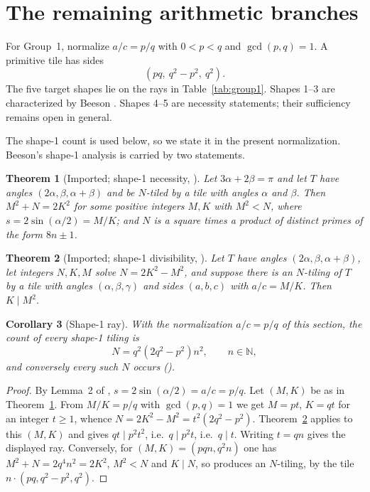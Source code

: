 \documentclass[11pt]{amsart}
\newtheorem{theorem}{Theorem}
\newtheorem{corollary}[theorem]{Corollary}
\theoremstyle{definition}
\theoremstyle{remark}
\newcommand{\N}{\mathbb N}
\begin{document}
\section{The remaining arithmetic branches}\label{sec:otherbranches}

For Group~1, normalize $a/c=p/q$ with $0<p<q$ and $\gcd(p,q)=1$.  A primitive
tile has sides
\[
                  (pq,\ q^2-p^2,\ q^2).
\]
The five target shapes lie on the rays in Table~\ref{tab:group1}.  Shapes
1--3 are characterized by Beeson \cite{Beeson2229}.  Shapes 4--5 are
necessity statements; their sufficiency remains open in general.

The shape-1 count is used below, so we state it in the present
normalization.  Beeson's shape-1 analysis is carried by two statements.

\begin{theorem}[Imported; shape-1 necessity,
{\cite[Thm.~4]{Beeson2229}}]\label{thm:imp-b4}
Let $3\alpha+2\beta=\pi$ and let $T$ have angles
$(2\alpha,\beta,\alpha+\beta)$ and be $N$-tiled by a tile with angles
$\alpha$ and $\beta$.  Then $M^2+N=2K^2$ for some positive integers $M,K$
with $M^2<N$, where $s=2\sin(\alpha/2)=M/K$; and $N$ is a square times a
product of distinct primes of the form $8n\pm1$.
\end{theorem}

\begin{theorem}[Imported; shape-1 divisibility,
{\cite[Thm.~6]{Beeson2229}}]\label{thm:imp-b6}
Let $T$ have angles $(2\alpha,\beta,\alpha+\beta)$, let integers $N,K,M$
solve $N=2K^2-M^2$, and suppose there is an $N$-tiling of $T$ by a tile with
angles $(\alpha,\beta,\gamma)$ and sides $(a,b,c)$ with $a/c=M/K$.  Then
$K\mid M^2$.
\end{theorem}

\begin{corollary}[Shape-1 ray]\label{cor:shape1ray}
With the normalization $a/c=p/q$ of this section, the count of every
shape-1 tiling is
\[
   N=q^2(2q^2-p^2)n^2,\qquad n\in\N,
\]
and conversely every such $N$ occurs \textup{(\cite[Thm.~5]{Beeson2229})}.
\end{corollary}

\begin{proof}
By Lemma~2 of \cite{Beeson2229}, $s=2\sin(\alpha/2)=a/c=p/q$.  Let $(M,K)$
be as in Theorem~\ref{thm:imp-b4}.  From $M/K=p/q$ with $\gcd(p,q)=1$ we get
$M=pt$, $K=qt$ for an integer $t\ge1$, whence
$N=2K^2-M^2=t^2(2q^2-p^2)$.  Theorem~\ref{thm:imp-b6} applies to this
$(M,K)$ and gives $qt\mid p^2t^2$, i.e.\ $q\mid p^2t$, i.e.\ $q\mid t$.
Writing $t=qn$ gives the displayed ray.  Conversely, for $(M,K)=(pqn,q^2n)$
one has $M^2+N=2q^4n^2=2K^2$, $M^2<N$ and $K\mid N$, so
\cite[Thm.~5]{Beeson2229} produces an $N$-tiling, by the tile
$n\cdot(pq,q^2-p^2,q^2)$.
\end{proof}
\end{document}
